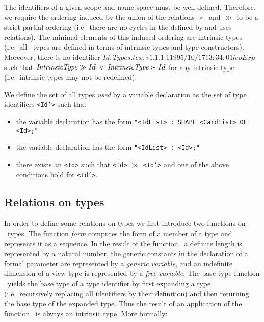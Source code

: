 \noindent The identifiers of a given scope and name space must be
well-defined. Therefore, we require the ordering induced by the union
of the relations $\succ$ and $\gg$ to be a strict partial ordering
(i.e.\ there are no cycles in the defined-by and uses relations). The
minimal elements of this induced ordering are intrinsic types (i.e.\
all \Booster\ types are defined in terms of intrinsic types and type
constructors). Moreover, there is no identifier $Id: Types.tex,v 1.1.1.1 1995/10/17 13:34:01 leo Exp $ such that \(
\mbox{\em IntrinsicType} \gg Id \; \vee \; \mbox{\em IntrinsicType}
\succ Id \) for any intrinsic type (i.e.\ intrinsic types may not be
redefined).

We define the set of all types {\em used} by a variable declaration as
the set of type identifiers {\small \tt <Id'>} such that

\begin{itemize}

\item the variable declaration has the form {\tt "<IdList> : SHAPE
<CardList> OF <Id>;" }

\item the variable declaration has the form { \tt "<IdList> : <Id>;" }
\item there exists an {\small \tt <Id>} such that {\small \tt <Id>}
$\gg$ {\small \tt <Id'>} and one of the above conditions hold for
{\small \tt <Id'>}.

\end{itemize}

\subsection*{Relations on types}

\noindent In order to define some relations on types we first
introduce two functions on \Booster\ types. The function {\em form}
computes the form of a member of a type and represents it as a
sequence. In the result of the function \form\ a definite length is
represented by a natural number, the generic constants in the
declaration of a formal parameter are represented by a {\em generic
variable}, and an indefinite dimension of a view type is represented
by a {\em free variable}. The base type function \bt\ yields the base
type of a type identifier by first expanding a type (i.e.\ recursively
replacing all identifiers by their definition) and then returning the
base type of the expanded type. Thus the result of an application of
the function \bt\ is always an intrinsic type. More formally:

